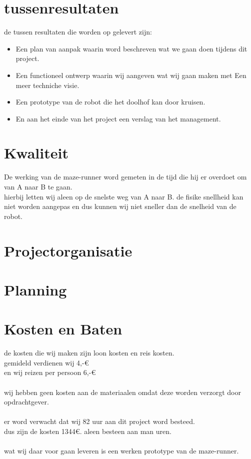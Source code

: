 \documentclass[oneside]{book}
\begin{document}
\chapter{tussenresultaten}
	de tussen resultaten die worden op gelevert zijn:
\begin{itemize}
	\item Een plan van aanpak waarin word beschreven wat we gaan doen tijdens dit project.
	\item Een functioneel ontwerp waarin wij aangeven wat wij gaan maken met Een meer techniche visie.
	\item Een prototype van de robot die het doolhof kan door kruisen.
	\item En aan het einde van het project een verslag van het management.
\end{itemize}
\clearpage
\chapter{Kwaliteit}
	De werking van de maze-runner word gemeten in de tijd die hij er overdoet om van A naar B te gaan.\\
	hierbij letten wij aleen op de snelste weg van A naar B. de fisike snellheid kan niet worden aangepas en dus kunnen wij niet sneller dan de snelheid van de robot.
\clearpage
\chapter{Projectorganisatie}

\clearpage
\chapter{Planning}
\begin{table}

\end{table}
\clearpage
\chapter{Kosten en Baten}
de kosten die wij maken zijn loon kosten en reis kosten.\\
gemideld verdienen wij 4,-\euro{} \\
en wij reizen per persoon 6,-\euro{} \\ 
\\
wij hebben geen kosten aan de materiaalen omdat deze worden verzorgt door opdrachtgever.\\
\\
er word verwacht dat wij 82 uur aan dit project word besteed.\\
dus zijn de kosten 1344\euro{}. aleen besteen aan man uren.\\
\\
wat wij daar voor gaan leveren is een werken prototype van de maze-runner.
\clearpage
\end{document}

